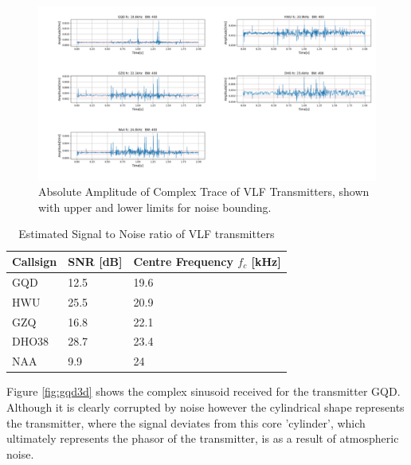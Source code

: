 \begin{figure}[h!]
    \centering
    \includegraphics[width = \textwidth]{figs/sig_character/abs_amplitude.png}
    \caption{\centering Absolute Amplitude of Complex Trace of VLF Transmitters, shown with upper and lower limits for noise bounding.}
    \label{fig:absAmplitude}
\end{figure}

\begin{table}[h!]
\centering
    \begin{tabular}{l|l|l}
    Callsign & SNR [dB] & Centre Frequency $f_c$ [kHz] \\
    \hline
    GQD & 12.5 & 19.6 \\
    HWU & 25.5 & 20.9 \\
    GZQ & 16.8 & 22.1 \\
    DHO38 & 28.7 & 23.4 \\
    NAA & 9.9 & 24
    \end{tabular}
\caption{Estimated Signal to Noise ratio of VLF transmitters}
\label{tab:snr1}
\end{table}

Figure \ref{fig:gqd3d} shows the complex sinusoid received for the transmitter GQD. Although it is clearly corrupted by noise however the cylindrical shape represents the transmitter, where the signal deviates from this core 'cylinder', which ultimately represents the phasor of the transmitter, is as a result of atmospheric noise. 

